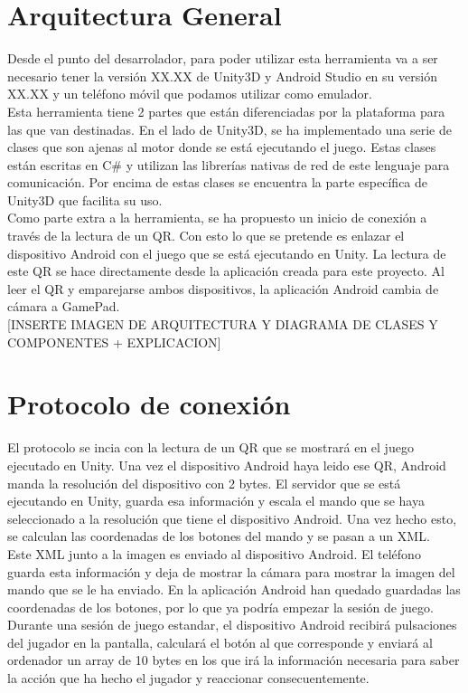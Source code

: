 \section{Arquitectura General}
\label{cap4:sec:arquitectura_general}
Desde el punto del desarrolador, para poder utilizar esta herramienta va a ser necesario tener la versi\'on XX.XX de Unity3D y Android Studio en su versi\'on XX.XX y un tel\'efono m\'ovil que podamos utilizar como emulador.
\\
Esta herramienta tiene 2 partes que est\'an diferenciadas por la plataforma para las que van destinadas. En el lado de Unity3D, se ha implementado una serie de clases que son ajenas al motor donde se est\'a ejecutando el juego. 
Estas clases est\'an escritas en C\# y utilizan las librer\'ias  nativas de red de este lenguaje para comunicaci\'on. Por encima de estas clases se encuentra la parte espec\'ifica de Unity3D que facilita su uso. 
\\
Como parte extra a la herramienta, se ha propuesto un inicio de conexi\'on a trav\'es de la lectura de un QR. Con esto lo que se pretende es enlazar el dispositivo Android con el juego que se est\'a ejecutando en Unity. 
La lectura de este QR se hace directamente desde la aplicaci\'on creada para este proyecto. Al leer el QR y emparejarse ambos dispositivos, la aplicaci\'on Android cambia de c\'amara a GamePad.
\\

[INSERTE IMAGEN DE ARQUITECTURA Y DIAGRAMA DE CLASES Y COMPONENTES  + EXPLICACION]


\section{Protocolo de conexi\'on}
\label{cap4:sec:protocolo}

El protocolo se incia con la lectura de un QR que se mostrar\'a en el juego ejecutado en Unity. Una vez el dispositivo Android haya leido ese QR, Android manda la resoluci\'on del dispositivo con 2 bytes. 
El servidor que se est\'a ejecutando en Unity, guarda esa informaci\'on y escala el mando que se haya seleccionado a la resoluci\'on que tiene el dispositivo Android. Una vez hecho esto, se calculan las coordenadas de los botones del mando y se pasan a un XML.
\\
Este XML junto a la imagen es enviado al dispositivo Android. El tel\'efono guarda esta informaci\'on y deja de mostrar la c\'amara para mostrar la imagen del mando que se le ha enviado. En la aplicaci\'on Android han quedado guardadas las coordenadas de los botones, por lo que ya podr\'ia empezar la sesi\'on de juego.
\\
Durante una sesi\'on de juego estandar, el dispositivo Android recibir\'a pulsaciones del jugador en la pantalla, calcular\'a el bot\'on al que corresponde y enviar\'a al ordenador un array de 10 bytes en los que ir\'a la informaci\'on necesaria para saber la acci\'on que ha hecho el jugador y reaccionar consecuentemente.
\\

